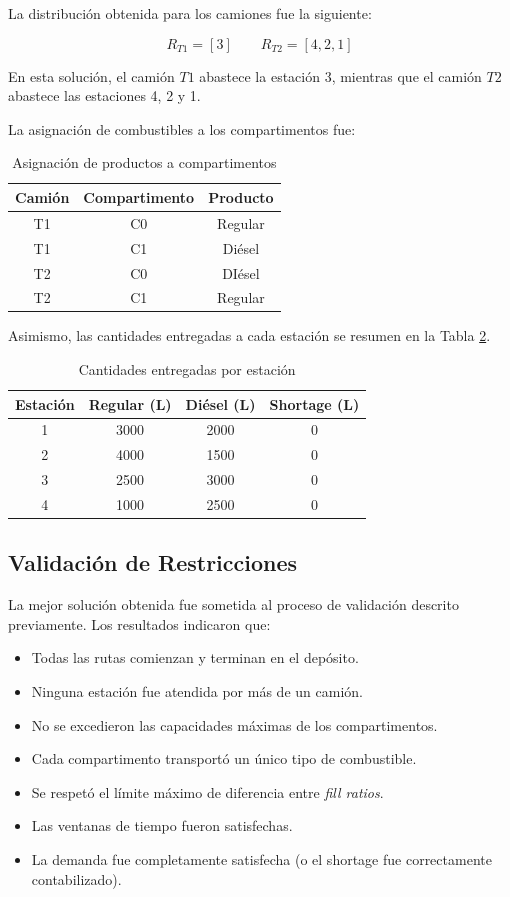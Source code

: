 La distribución obtenida para los camiones fue la siguiente:

\[
R_{T1} = [3]
\qquad
R_{T2} = [4,2,1]
\]

En esta solución, el camión $T1$ abastece la estación 3, mientras que el camión $T2$ abastece las estaciones 4, 2 y 1.

La asignación de combustibles a los compartimentos fue:

\begin{table}[H]
\centering
\caption{Asignación de productos a compartimentos}
\label{tab:compartimentos}
\begin{tabular}{c|cc}
\toprule
Camión & Compartimento & Producto \\
\midrule
T1 & C0 & Regular \\
T1 & C1 & Diésel \\
T2 & C0 & DIésel \\
T2 & C1 & Regular \\
\bottomrule
\end{tabular}
\end{table}

Asimismo, las cantidades entregadas a cada estación se resumen en la Tabla \ref{tab:entregas}.

\begin{table}[H]
\centering
\caption{Cantidades entregadas por estación}
\label{tab:entregas}
\begin{tabular}{c|ccc}
\toprule
Estación & Regular (L) & Diésel (L) & Shortage (L) \\
\midrule
1 & 3000 & 2000 & 0 \\
2 & 4000 & 1500 & 0 \\
3 & 2500 & 3000 & 0 \\
4 & 1000 & 2500 & 0 \\
\bottomrule
\end{tabular}
\end{table}

\subsection{Validación de Restricciones}

La mejor solución obtenida fue sometida al proceso de validación descrito previamente. Los resultados indicaron que:

\begin{itemize}
\item Todas las rutas comienzan y terminan en el depósito.
\item Ninguna estación fue atendida por más de un camión.
\item No se excedieron las capacidades máximas de los compartimentos.
\item Cada compartimento transportó un único tipo de combustible.
\item Se respetó el límite máximo de diferencia entre \textit{fill ratios}.
\item Las ventanas de tiempo fueron satisfechas.
\item La demanda fue completamente satisfecha (o el shortage fue correctamente contabilizado).
\end{itemize}

